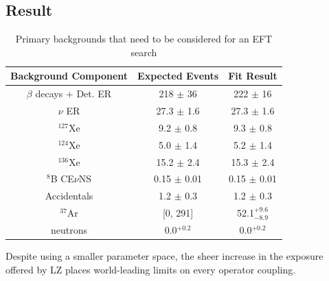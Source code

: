 

\subsection{Result}




\begin{table}[]
    \centering
    \begin{tabular}{c|c|c}
        Background Component     & Expected Events    & Fit Result  \\ \hline
        $\beta$ decays + Det. ER & 218 $\pm$ 36       & 222 $\pm$ 16 \\
        $\nu$ ER                 & 27.3 $\pm$ 1.6     & 27.3 $\pm$ 1.6 \\
        ${}^{127}$Xe             & 9.2 $\pm$ 0.8      & 9.3 $\pm$ 0.8 \\
        ${}^{124}$Xe             & 5.0 $\pm$ 1.4      & 5.2 $\pm$ 1.4 \\
        ${}^{136}$Xe             & 15.2 $\pm$ 2.4     & 15.3 $\pm$ 2.4 \\
        ${}^{8}$B CE$\nu$NS      & 0.15 $\pm$ 0.01    & 0.15 $\pm$ 0.01 \\
        Accidentals              & 1.2 $\pm$ 0.3      & 1.2 $\pm$ 0.3 \\
        ${}^{37}$Ar              & [0, 291]           & 52.1${}^{+9.6}_{-8.9}$ \\
        neutrons                 & 0.0${}^{+0.2}$     & 0.0${}^{+0.2}$
    \end{tabular}
    \caption{Primary backgrounds that need to be considered for an EFT search}
    \label{tab:sr1_ws_lz_backgrounds}
\end{table}


Despite using a smaller parameter space, the sheer increase in the exposure offered by LZ places world-leading limits on every operator coupling.